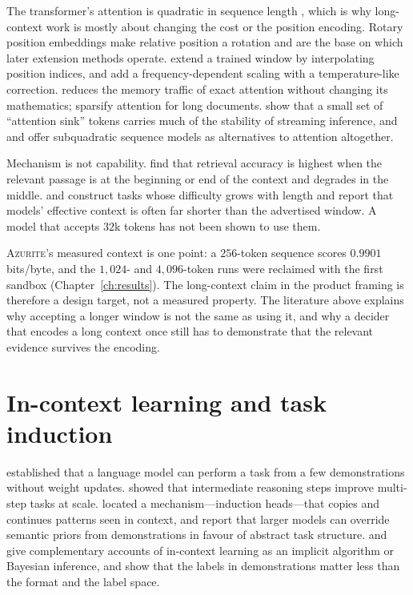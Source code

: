 The transformer's attention is quadratic in sequence length \citep{vaswani2017attention},
which is why long-context work is mostly about changing the cost or the position
encoding. Rotary position embeddings \citep{su2021roformer} make relative position
a rotation and are the base on which later extension methods operate.
\citet{chen2023pi} extend a trained window by interpolating position indices, and
\citet{peng2023yarn} add a frequency-dependent scaling with a temperature-like
correction. \citet{dao2022flashattention} reduces the memory traffic of exact
attention without changing its mathematics; \citet{beltagy2020longformer} sparsify
attention for long documents. \citet{xiao2023streaming} show that a small set of
``attention sink'' tokens carries much of the stability of streaming inference,
and \citet{gu2023mamba} and \citet{poli2023hyena} offer subquadratic sequence
models as alternatives to attention altogether.

Mechanism is not capability. \citet{liu2023lost} find that retrieval accuracy is
highest when the relevant passage is at the beginning or end of the context and
degrades in the middle. \citet{hsieh2024ruler} and \citet{bai2023longbench}
construct tasks whose difficulty grows with length and report that models'
effective context is often far shorter than the advertised window. A model that
accepts $32$k tokens has not been shown to use them.

\textsc{Azurite}'s measured context is one point: a $256$-token sequence scores
$0.9901$ bits/byte, and the $1{,}024$- and $4{,}096$-token runs were reclaimed
with the first sandbox (Chapter~\ref{ch:results}). The long-context claim in the
product framing is therefore a design target, not a measured property. The
literature above explains why accepting a longer window is not the same as using
it, and why a decider that encodes a long context once still has to demonstrate
that the relevant evidence survives the encoding.

\section{In-context learning and task induction}

\citet{brown2020gpt3} established that a language model can perform a task from a
few demonstrations without weight updates. \citet{wei2022cot} showed that
intermediate reasoning steps improve multi-step tasks at scale.
\citet{olsson2022induction} located a mechanism---induction heads---that copies
and continues patterns seen in context, and \citet{wei2023larger} report that
larger models can override semantic priors from demonstrations in favour of
abstract task structure. \citet{akyurek2022what} and \citet{xie2022explanation}
give complementary accounts of in-context learning as an implicit algorithm or
Bayesian inference, and \citet{min2022rethinking} show that the labels in
demonstrations matter less than the format and the label space.

